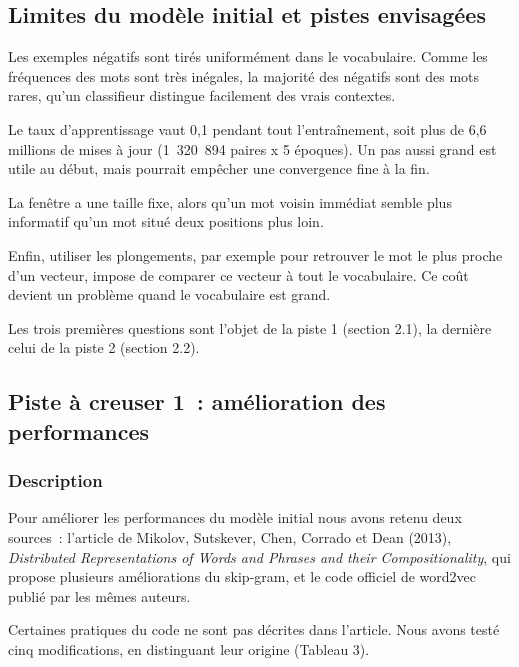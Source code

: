 \documentclass[11pt,a4paper]{article}
\begin{document}
\subsection*{Limites du modèle initial et pistes envisagées}


Les exemples négatifs sont tirés uniformément dans le vocabulaire. Comme les fréquences des mots sont très inégales, la majorité des négatifs sont des mots rares, qu’un classifieur distingue facilement des vrais contextes.

Le taux d’apprentissage vaut 0,1 pendant tout l’entraînement, soit plus de 6,6 millions de mises à jour (1~320~894 paires x 5 époques). Un pas aussi grand est utile au début, mais pourrait empêcher une convergence fine à la fin.

La fenêtre a une taille fixe, alors qu’un mot voisin immédiat semble plus informatif qu’un mot situé deux positions plus loin.

Enfin, utiliser les plongements, par exemple pour retrouver le mot le plus proche d’un vecteur, impose de comparer ce vecteur à tout le vocabulaire. Ce coût devient un problème quand le vocabulaire est grand.

Les trois premières questions sont l’objet de la piste 1 (section 2.1), la dernière celui de la piste 2 (section 2.2).

\subsection{Piste à creuser 1~: amélioration des performances}

\subsubsection{Description}

Pour améliorer les performances du modèle initial nous avons retenu deux sources~: l’article de Mikolov, Sutskever, Chen, Corrado et Dean (2013), \emph{Distributed Representations of Words and Phrases and their Compositionality}, qui propose plusieurs améliorations du skip-gram, et le code officiel de word2vec publié par les mêmes auteurs.

Certaines pratiques du code ne sont pas décrites dans l’article. Nous avons testé cinq modifications, en distinguant leur origine (Tableau 3).
\end{document}
